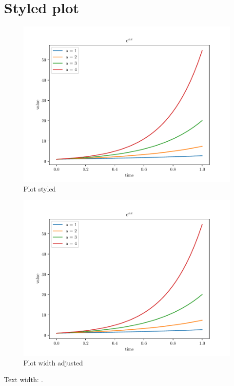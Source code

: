 \documentclass{article}
\begin{document}
\section{Styled plot}
\lipsum[4]
\begin{figure}[!ht]
    \centering
    \includegraphics[width=\textwidth]{images/plot3.pdf}
    \caption{Plot styled}
    \label{fig:plot_3_textwidth}
\end{figure}
\begin{figure}[!ht]
    \centering
    \includegraphics{images/plot3.pdf}
    \caption{Plot width adjusted}
    \label{fig:plot_3}
\end{figure}

Text width: \the\textwidth.
\clearpage
\end{document}
